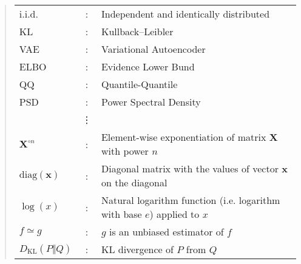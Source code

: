 \documentclass[ oneside,%
                    author={George Herbert},
                    degree={MSci},
                     title={Video Diffusion Models for Climate Simulations},
                  subtitle={}]{dissertation}
\begin{document}
\begin{quote}
\noindent
\begin{tabular}{lcl}
      i.i.d. &: & Independent and identically distributed\\
      KL &: & Kullback--Leibler\\
      VAE &: & Variational Autoencoder\\
      ELBO &: & Evidence Lower Bund\\
      QQ &: & Quantile-Quantile\\
      PSD &: & Power Spectral Density\\
      &\vdots&\\
      $\mathbf{X}^{\circ n}$ &: & Element-wise exponentiation of matrix $\mathbf{X}$ with power $n$\\
      $\mathrm{diag}(\mathbf{x})$ &: & Diagonal matrix with the values of vector $\mathbf{x}$ on the diagonal\\
      $\log(x)$ &: & Natural logarithm function (i.e. logarithm with base $e$) applied to $x$\\
      $f\simeq g$ &: & $g$ is an unbiased estimator of $f$\\
      $D_{\mathrm{KL}}(P\Vert Q)$ &: & KL divergence of $P$ from $Q$\\

\end{tabular}
\end{quote}


\end{document}

